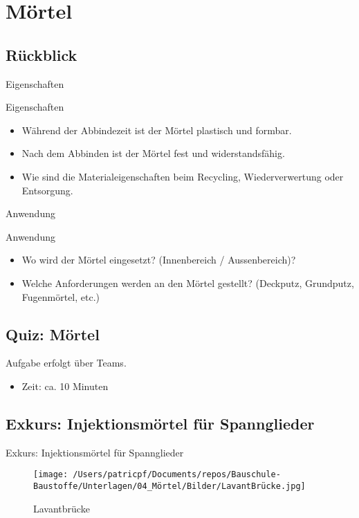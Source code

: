 \section{Mörtel}
\BlueSectionSlide
\subsection{Rückblick}
\begin{frame}{Eigenschaften}
    \begin{block}{Eigenschaften}
        \begin{itemize}
            \item [\textbullet] Während der Abbindezeit ist der Mörtel plastisch und formbar.
            \item [\textbullet] Nach dem Abbinden ist der Mörtel fest und widerstandsfähig.
            \item [\textbullet] Wie sind die Materialeigenschaften beim Recycling, Wiederverwertung oder Entsorgung.
        \end{itemize}
    \end{block}

\end{frame}

\begin{frame}{Anwendung}
    \begin{block}{Anwendung}
        \begin{itemize}
            \item [\textbullet] Wo wird der Mörtel eingesetzt? (Innenbereich / Aussenbereich)?
            \item [\textbullet] Welche Anforderungen werden an den Mörtel gestellt? (Deckputz, Grundputz, Fugenmörtel, etc.)
        \end{itemize}
    \end{block}
\end{frame}

\subsection{Quiz: Mörtel}
\begin{frame}{Aufgabe erfolgt über Teams.}
    \begin{itemize}
        \item [\textbullet] Zeit: ca. 10 Minuten
    \end{itemize}

\end{frame}


\subsection{Exkurs: Injektionsmörtel für Spannglieder}
\begin{frame}{Exkurs: Injektionsmörtel für Spannglieder}
    \begin{figure}[H]
        \centering
        \texttt{[image: /Users/patricpf/Documents/repos/Bauschule-Baustoffe/Unterlagen/04\_Mörtel/Bilder/LavantBrücke.jpg]}
        \caption{Lavantbrücke}
    \end{figure}
\end{frame}

